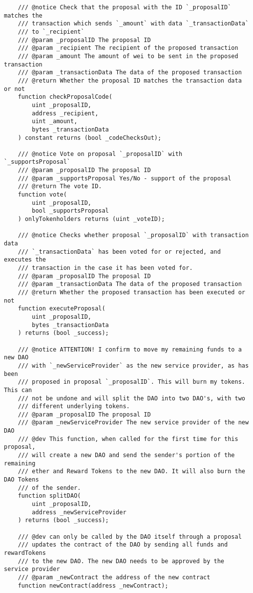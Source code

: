 \documentclass[9pt,oneside]{amsart}
\begin{document}
\begin{appendix}
\begin{verbatim}
    /// @notice Check that the proposal with the ID `_proposalID` matches the
    /// transaction which sends `_amount` with data `_transactionData`
    /// to `_recipient`
    /// @param _proposalID The proposal ID
    /// @param _recipient The recipient of the proposed transaction
    /// @param _amount The amount of wei to be sent in the proposed transaction
    /// @param _transactionData The data of the proposed transaction
    /// @return Whether the proposal ID matches the transaction data or not
    function checkProposalCode(
        uint _proposalID,
        address _recipient,
        uint _amount,
        bytes _transactionData
    ) constant returns (bool _codeChecksOut);

    /// @notice Vote on proposal `_proposalID` with `_supportsProposal`
    /// @param _proposalID The proposal ID
    /// @param _supportsProposal Yes/No - support of the proposal
    /// @return The vote ID.
    function vote(
        uint _proposalID,
        bool _supportsProposal
    ) onlyTokenholders returns (uint _voteID);

    /// @notice Checks whether proposal `_proposalID` with transaction data
    /// `_transactionData` has been voted for or rejected, and executes the
    /// transaction in the case it has been voted for.
    /// @param _proposalID The proposal ID
    /// @param _transactionData The data of the proposed transaction
    /// @return Whether the proposed transaction has been executed or not
    function executeProposal(
        uint _proposalID,
        bytes _transactionData
    ) returns (bool _success);

    /// @notice ATTENTION! I confirm to move my remaining funds to a new DAO
    /// with `_newServiceProvider` as the new service provider, as has been
    /// proposed in proposal `_proposalID`. This will burn my tokens. This can
    /// not be undone and will split the DAO into two DAO's, with two
    /// different underlying tokens.
    /// @param _proposalID The proposal ID
    /// @param _newServiceProvider The new service provider of the new DAO
    /// @dev This function, when called for the first time for this proposal,
    /// will create a new DAO and send the sender's portion of the remaining
    /// ether and Reward Tokens to the new DAO. It will also burn the DAO Tokens
    /// of the sender.
    function splitDAO(
        uint _proposalID,
        address _newServiceProvider
    ) returns (bool _success);

    /// @dev can only be called by the DAO itself through a proposal
    /// updates the contract of the DAO by sending all funds and rewardTokens
    /// to the new DAO. The new DAO needs to be approved by the service provider
    /// @param _newContract the address of the new contract
    function newContract(address _newContract);



\end{verbatim}
\end{appendix}
\end{document}
